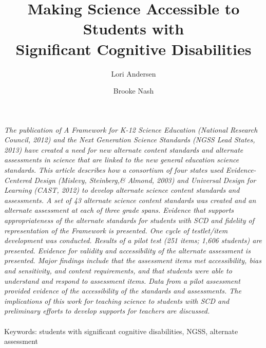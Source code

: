 \documentclass[11.5pt]{sig-alternate} %
\makeatletter
\let\oldabstract\abstract
\let\oldendabstract\endabstract
\renewenvironment{abstract} %
{\renewenvironment{quotation}%
               {\list{}{\addtolength{\leftmargin}{1em} %
                        \listparindent 1.5em%
                        \itemindent    \listparindent%
                        \rightmargin   \leftmargin%
                        \parsep        \z@ \@plus\p@}%
                \item\relax}%
               {\endlist}%
\oldabstract}
{\oldendabstract}
\makeatother
\begin{document}
\title{Making Science Accessible to Students with \\ Significant Cognitive Disabilities}

\author[1]{\large \color{blue}Lori Andersen}
\author[1]{\large \color{blue}Brooke Nash}


\toappear{}
\maketitle
\begin{@twocolumnfalse} 
\begin{abstract}
\item 
\textit{The publication of A Framework for K-12 Science Education (National Research Council, 2012) and the Next Generation Science Standards (NGSS Lead States, 2013) have created a need for new alternate content standards and alternate assessments in science that are linked to the new general education science standards. This article describes how a consortium of four states used Evidence-Centered Design (Mislevy, Steinberg,\& Almond, 2003) and Universal Design for Learning (CAST, 2012) to develop alternate science content standards and assessments. A set of 43 alternate science content standards was created and an alternate assessment at each of three grade spans. Evidence that supports appropriateness of the alternate standards for students with SCD and fidelity of representation of the Framework is presented. One cycle of testlet/item development was conducted. Results of a pilot test (251 items; 1,606 students) are presented. Evidence for validity and accessibility of the alternate assessment is presented. Major findings include that the assessment items met accessibility, bias and sensitivity, and content requirements, and that students were able to understand and respond to assessment items. Data from a pilot assessment provided evidence of the accessibility of the standards and assessments. The implications of this work for teaching science to students with SCD and preliminary efforts to develop supports for teachers are discussed.}
\\ \\
Keywords: students with significant cognitive disabilities, NGSS, alternate assessment
\end{abstract}
\end{@twocolumnfalse}

\end{document}

